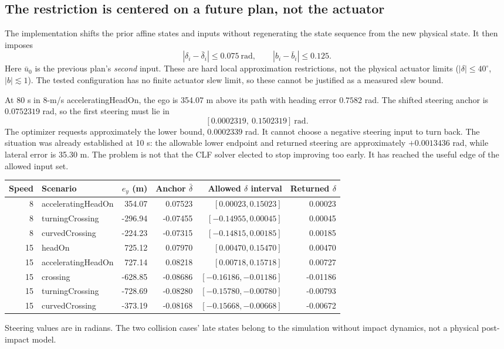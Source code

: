 \documentclass[11pt]{article}
\begin{document}
\subsection{The restriction is centered on a future plan, not the actuator}
The implementation shifts the prior affine states and inputs without
regenerating the state sequence from the new physical state. It then imposes
\[
 |\delta_i-\bar\delta_i|\le0.075\ \mathrm{rad},\qquad
 |b_i-\bar b_i|\le0.125.
\]
Here $\bar u_0$ is the previous plan's \emph{second} input. These are hard
local approximation restrictions, not the physical actuator limits
($|\delta|\le40^\circ$, $|b|\lesssim1$). The tested configuration has no finite
actuator slew limit, so these cannot be justified as a measured slew bound.

At 80 s in 8-m/s acceleratingHeadOn, the ego is 354.07 m above its path with
heading error $0.7582$ rad. The shifted steering anchor is $0.0752319$ rad,
so the first steering must lie in
\[
 [0.0002319,\ 0.1502319]\ \mathrm{rad}.
\]
The optimizer requests approximately the lower bound, $0.0002339$ rad.
It cannot choose a negative steering input to turn back. The situation was
already established at 10 s: the allowable lower endpoint and returned
steering are approximately $+0.0013436$ rad, while lateral error is 35.30 m.
The problem is not that the CLF solver elected to stop improving too early.
It has reached the useful edge of the allowed input set.

\begin{center}\small
\begin{tabular}{r l r r r r}
\toprule
Speed & Scenario & $e_y$ (m) & Anchor $\bar\delta$ & Allowed $\delta$ interval & Returned $\delta$\\
\midrule
8 & acceleratingHeadOn & 354.07 & 0.07523 & $[0.00023,0.15023]$ & 0.00023\\
8 & turningCrossing & -296.94 & -0.07455 & $[-0.14955,0.00045]$ & 0.00045\\
8 & curvedCrossing & -224.23 & -0.07315 & $[-0.14815,0.00185]$ & 0.00185\\
15 & headOn & 725.12 & 0.07970 & $[0.00470,0.15470]$ & 0.00470\\
15 & acceleratingHeadOn & 727.14 & 0.08218 & $[0.00718,0.15718]$ & 0.00727\\
15 & crossing & -628.85 & -0.08686 & $[-0.16186,-0.01186]$ & -0.01186\\
15 & turningCrossing & -728.69 & -0.08280 & $[-0.15780,-0.00780]$ & -0.00793\\
15 & curvedCrossing & -373.19 & -0.08168 & $[-0.15668,-0.00668]$ & -0.00672\\
\bottomrule
\end{tabular}\end{center}
Steering values are in radians. The two collision cases' late states belong
to the simulation without impact dynamics, not a physical post-impact model.
\end{document}
